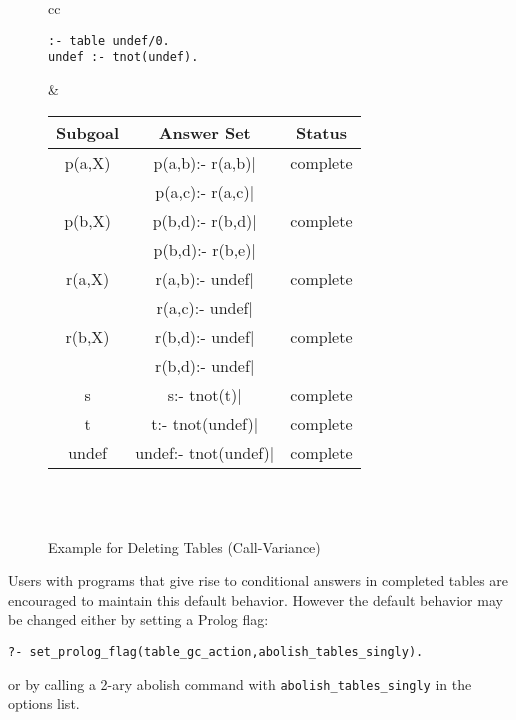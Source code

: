 \begin{description}
\begin{figure}[htb]
\begin{center}
\begin{tabular}{cc}
\begin{minipage}{14.5em}
\begin{verbatim}
:- table undef/0.
undef :- tnot(undef).
\end{verbatim}
\end{minipage}
&
\begin{tabular}{|c|c|c|} \hline
  Subgoal & Answer Set & Status\\ \hline \hline
  p(a,X)  & p(a,b):- r(a,b)$|$ & complete \\ 
          & p(a,c):- r(a,c)$|$ & \\ \hline
  p(b,X)  & p(b,d):- r(b,d)$|$ & complete \\ 
          & p(b,d):- r(b,e)$|$ & \\ \hline \hline
  r(a,X)  & r(a,b):- undef$|$  & complete \\ 
          & r(a,c):- undef$|$  & \\ \hline
  r(b,X)  & r(b,d):- undef$|$  & complete \\ 
          & r(b,d):- undef$|$  & \\ \hline \hline
  s       & s:- tnot(t)$|$     & complete \\ \hline \hline
  t       & t:- tnot(undef)$|$ & complete \\ \hline \hline
  undef   & undef:- tnot(undef)$|$ & complete \\ \hline \hline
\end{tabular} \\
\vspace*{-2ex} \\ \hline \hline
\end{tabular}
\end{center}
\caption{Example for Deleting Tables (Call-Variance)} \label{ex:deletion}
\end{figure}

Users with programs that give rise to conditional answers in completed
tables are encouraged to maintain this default behavior.  However the
default behavior may be changed either by setting a Prolog flag:
%
\begin{verbatim}
?- set_prolog_flag(table_gc_action,abolish_tables_singly).
\end{verbatim}
%
or by calling a 2-ary abolish command with {\tt abolish\_tables\_singly}
in the options list.


\end{description}
